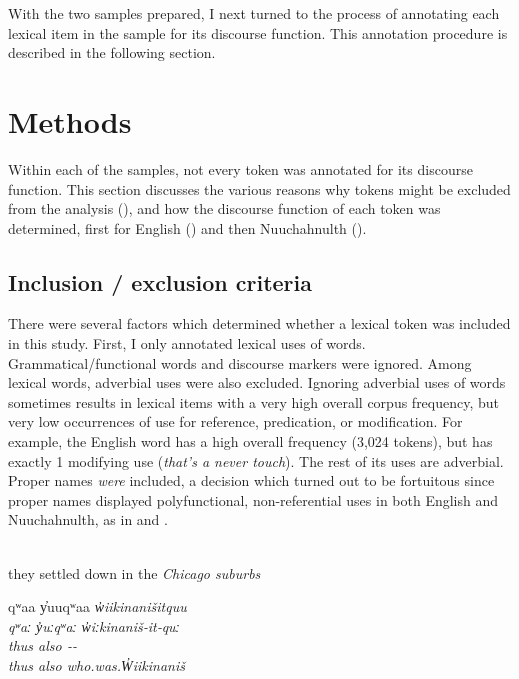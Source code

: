 With the two samples prepared, I next turned to the process of annotating each lexical item in the sample for its discourse function. This annotation procedure is described in the following section.

\section{Methods}
\label{sec:3.3}

Within each of the samples, not every token was annotated for its discourse function. This section discusses the various reasons why tokens might be excluded from the analysis (), and how the discourse function of each token was determined, first for English () and then Nuuchahnulth ().

\subsection{Inclusion / exclusion criteria}
\label{sec:3.3.1}

There were several factors which determined whether a lexical token was included in this study. First, I only annotated lexical uses of words. Grammatical/functional words and discourse markers were ignored. Among lexical words, adverbial uses were also excluded. Ignoring adverbial uses of words sometimes results in lexical items with a very high overall corpus frequency, but very low occurrences of use for reference, predication, or modification. For example, the English word  has a high overall frequency (3,024 tokens), but has exactly 1 modifying use (\textit{that's a \em{never} touch}). The rest of its uses are adverbial. Proper names \emph{were} included, a decision which turned out to be fortuitous since proper names displayed polyfunctional, non-referential uses in both English and Nuuchahnulth, as in  and .

\begin{exe}

  \ex\label{ex:3.2}
  \\
  they settled down in the \em{Chicago} suburbs

  \ex\label{ex:3.3}
  \vfix
  \gllll qʷaa y̓uuqʷaa \em{w̓iikinanišitquu}\\
         qʷaː y̓uːqʷaː \em{w̓iːkinaniš‑it‑quː}\\
         thus also    \em{‑‑}\\
         thus also    \em{who.was.W̓iikinaniš}\\
         \vfix

\end{exe}


